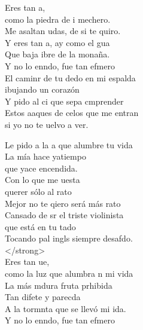 \begin{cancion}%
	Eres tan a, \\
	como la piedra de i mechero.\\
	Me asaltan udas, de si te quiro.\\
	Y eres tan a, ay como el gua \\
	Que baja ibre de la monaña.\\
	\jump
	Y no lo enndo, fue tan efmero \\
	El caminr de tu dedo en mi espalda \\
	ibujando un corazón\\
	Y pido al ci que sepa cmprender\\
	Estos aaques de celos que me entran\\
	si yo no te uelvo a ver.\jump\\
	\begin{chorus}%
		Le pido a la a que alumbre tu vida\\
		La mía hace yatiempo \\
	\jump
	que yace encendida.\\
		Con lo que me uesta \\
	\jump
	querer sólo al rato\\
		Mejor no te qiero será más rato\\
		Cansado de sr el triste violinista \\
		que está en tu tado\\
		Tocando pal ingls siempre desafdo. \\
	 </strong>\\
		Eres tan ue, \\
		como la luz que alumbra n mi vida\\
		La más mdura fruta prhibida\\
		Tan difete y parecda\\
		A la tormnta que se llevó mi ida.\\
	\jump
		Y no lo enndo, fue tan efmero \\

\end{chorus}
\end{cancion}
